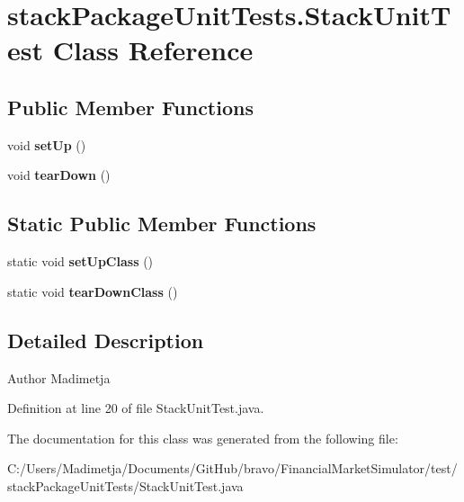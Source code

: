 \hypertarget{classstack_package_unit_tests_1_1_stack_unit_test}{\section{stack\+Package\+Unit\+Tests.\+Stack\+Unit\+Test Class Reference}
\label{classstack_package_unit_tests_1_1_stack_unit_test}
}
\subsection*{Public Member Functions}
\begin{DoxyCompactItemize}
\item 
\hypertarget{classstack_package_unit_tests_1_1_stack_unit_test_a21d7f0fe59add6adeba3968a0efd6665}{void {\bfseries set\+Up} ()}\label{classstack_package_unit_tests_1_1_stack_unit_test_a21d7f0fe59add6adeba3968a0efd6665}

\item 
\hypertarget{classstack_package_unit_tests_1_1_stack_unit_test_a2e35176b63667c6e025495e811b5d473}{void {\bfseries tear\+Down} ()}\label{classstack_package_unit_tests_1_1_stack_unit_test_a2e35176b63667c6e025495e811b5d473}

\end{DoxyCompactItemize}
\subsection*{Static Public Member Functions}
\begin{DoxyCompactItemize}
\item 
\hypertarget{classstack_package_unit_tests_1_1_stack_unit_test_ab44e5f0e6f4dfcdc89b416109dd7db11}{static void {\bfseries set\+Up\+Class} ()}\label{classstack_package_unit_tests_1_1_stack_unit_test_ab44e5f0e6f4dfcdc89b416109dd7db11}

\item 
\hypertarget{classstack_package_unit_tests_1_1_stack_unit_test_ab065aabd4484126579c30a5ab4acb941}{static void {\bfseries tear\+Down\+Class} ()}\label{classstack_package_unit_tests_1_1_stack_unit_test_ab065aabd4484126579c30a5ab4acb941}

\end{DoxyCompactItemize}


\subsection{Detailed Description}
\begin{DoxyAuthor}{Author}
Madimetja 
\end{DoxyAuthor}


Definition at line 20 of file Stack\+Unit\+Test.\+java.



The documentation for this class was generated from the following file\+:\begin{DoxyCompactItemize}
\item 
C\+:/\+Users/\+Madimetja/\+Documents/\+Git\+Hub/bravo/\+Financial\+Market\+Simulator/test/stack\+Package\+Unit\+Tests/Stack\+Unit\+Test.\+java\end{DoxyCompactItemize}
